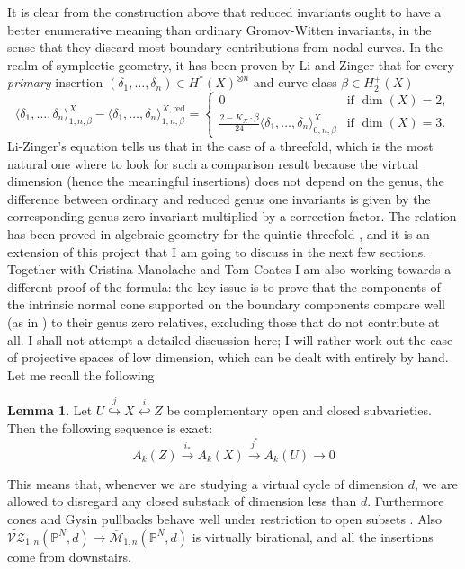 \documentclass[11pt]{amsart}
\newcommand{\M}[4]{\overline{\mathcal{M}}_{#1,#2}(#3,#4)}
\newcommand{\tVZ}[3]{\widetilde{\mathcal{V\!Z}}_{1,#1}(#2,#3)}
\newcommand{\PP}{\mathbb P}
\renewcommand{\to}{\rightarrow}
\theoremstyle{definition}
\newtheorem{lemma}[thm]{Lemma}
\theoremstyle{definition}
\begin{document}
It is clear from the construction above that reduced invariants ought to have a better enumerative meaning than ordinary Gromov-Witten invariants, in the sense that they discard most boundary contributions from nodal curves. In the realm of symplectic geometry, it has been proven by Li and Zinger \cite{LZ} that for every \emph{primary} insertion $(\delta_1,\ldots,\delta_n)\in H^*(X)^{\otimes n}$ and curve class $\beta\in H^+_2(X)$
\[
 \langle \delta_1,\ldots,\delta_n \rangle^X_{1,n,\beta}-\langle \delta_1,\ldots,\delta_n \rangle^{X,\mathrm{red}}_{1,n,\beta}=\begin{cases}
 0 & \text{if } \dim(X)=2, \\
 \frac{2-K_X\cdot\beta}{24}\langle \delta_1,\ldots,\delta_n \rangle^X_{0,n,\beta} & \text{if } \dim(X)=3.\end{cases}
\]
Li-Zinger's equation tells us that in the case of a threefold, which is the most natural one where to look for such a comparison result because the virtual dimension (hence the meaningful insertions) does not depend on the genus, the difference between ordinary and reduced genus one invariants is given by the corresponding genus zero invariant multiplied by a correction factor. The relation has been proved in algebraic geometry for the quintic threefold \cite{CL}, and it is an extension of this project that I am going to discuss in the next few sections. Together with Cristina Manolache and Tom Coates I am also working towards a different proof of the formula: the key issue is to prove that the components of the intrinsic normal cone supported on the boundary components compare well (as in \cite{Manolache-push}) to their genus zero relatives, excluding those that do not contribute at all. I shall not attempt a detailed discussion here; I will rather work out the case of projective spaces of low dimension, which can be dealt with entirely by hand. Let me recall the following
\begin{lemma}\cite[Proposition 1.8]{Ful}
Let $U\overset{j}{\hookrightarrow} X \overset{i}{\hookleftarrow} Z$ be complementary open and closed subvarieties. Then the following sequence is exact:
\[A_k(Z)\overset{i_*}{\to} A_k(X)\overset{j^*}{\to} A_k(U)\to 0\]
\end{lemma}
This means that, whenever we are studying a virtual cycle of dimension $d$, we are allowed to disregard any closed substack of dimension less than $d$. Furthermore cones and Gysin pullbacks behave well under restriction to open subsets \cite[Proposition 4.2(b) and Theorem 6.2(b)]{Ful}. Also $\tVZ{n}{\PP^N}{d}\to \M{1}{n}{\PP^N}{d}$ is virtually birational, and all the insertions come from downstairs.  
\end{document}
